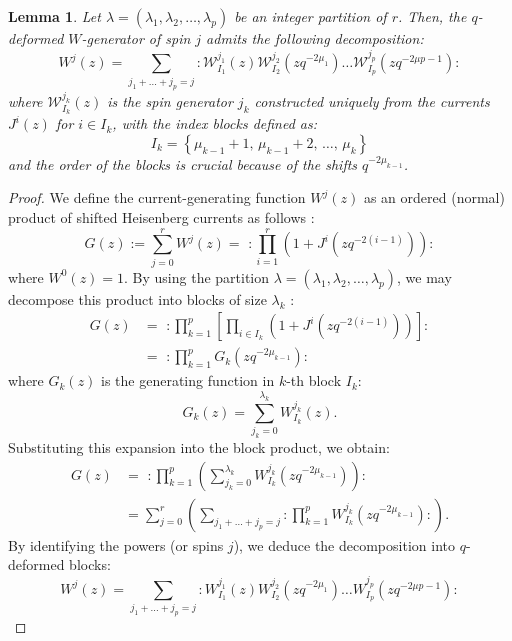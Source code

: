 \documentclass[reqno,11pt]{amsart}
\theoremstyle{plain}
\newtheorem{lemma}[theorem]{Lemma}
\theoremstyle{definition}
\theoremstyle{remark}
\numberwithin{equation}{section}
\newcommand{\1}{\mathds{1}}
\newcommand{\2}{\frac{1}{2}}
\begin{document}
{				\begin{lemma}\label{l:esp}
					Let $\lambda = (\lambda_1, \lambda_2, \ldots, \lambda_p)$ be an integer partition of $r$. 
					Then, the  $q$-deformed $W$-generator of spin $j$ admits the following decomposition:
					\begin{equation}
						W^j(z) = \sum_{j_1 + \dots + j_p = j} : \mathcal{W}^{j_1}_{I_1}(z) \mathcal{W}^{j_2}_{I_2}(zq^{-2\mu_1}) \dots \mathcal{W}^{j_p}_{I_p}(zq^{-2\mu{p-1}}) :
					\end{equation}
					where $\mathcal{W}^{j_k}_{I_k}(z)$ is the spin generator $j_k$ constructed uniquely from the currents $J^{i}(z)$ for $i\in I_k$, with the index blocks defined as:
					\begin{equation}
						I_k = \left\{ \mu_{k-1} + 1, \, \mu_{k-1} + 2, \, \dots, \, \mu_k \right\}
					\end{equation} 
					and the order of the blocks is crucial because of the shifts $q^{-2\mu_{k-1}}$.
				\end{lemma}
				\begin{proof}
					We define the current-generating function $W^{j}(z)$  as an ordered (normal) product of shifted Heisenberg currents as follows :
					\begin{equation}
						G(z) := \sum_{j=0}^r W^j(z) = \,\, : \prod_{i=1}^r \left( 1 + J^i(zq^{-2(i-1)}) \right) :
					\end{equation}
					where $W^{0}(z)=1$. By using the partition $\lambda = (\lambda_1, \lambda_2, \ldots, \lambda_p)$, we may decompose this product into blocks of size $\lambda_k$ :
					\begin{align}
						G(z) &= \,\, : \prod_{k=1}^{p} \left[ \prod_{i \in I_k} (1 + J^i(zq^{-2(i-1)})) \right] : \nonumber\\
						&= \,\, : \prod_{k=1}^{p} G_k(zq^{-2\mu_{k-1}}) :
					\end{align}
					where $G_k(z)$ is the generating function in $k$-th block $I_k$:
					\begin{equation}
						{G_k(z) = \sum_{j_k=0}^{\lambda_k} W^{j_k}_{I_k}(z)}.
					\end{equation}
					Substituting this expansion into the block product, we obtain:
					\begin{align}
						G(z) &= \,\, : \prod_{k=1}^{p} \left( \sum_{j_k=0}^{\lambda_k} W^{j_k}_{I_k}(zq^{-2\mu_{k-1}}) \right) : \nonumber\\
						&= \sum_{j=0}^r \left( \sum_{j_1+\dots+j_p=j} : \prod_{k=1}^p W^{j_k}_{I_k}(zq^{-2\mu_{k-1}}) : \right).
					\end{align}
					By identifying the powers (or spins $j$), we deduce the decomposition into $q$-deformed blocks:
					\begin{equation}
						W^j(z) = \sum_{j_1+\dots+j_p=j} : W^{j_1}_{I_1}(z) W^{j_2}_{I_2}(zq^{-2\mu_1}) \dots W^{j_p}_{I_p}(zq^{-2\mu{p-1}}) :
					\end{equation}
				\end{proof}
				
}
\end{document}
